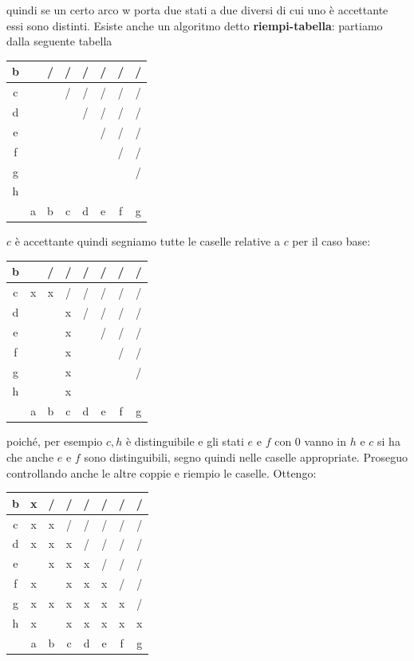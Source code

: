 quindi se un certo arco w porta due stati a due diversi di cui uno è accettante essi sono distinti.
Esiste anche un algoritmo detto \textbf{riempi-tabella}:
partiamo dalla seguente tabella
\begin{center}
	\begin{tabular}{c|c|c|c|c|c|c|c|}
		\hline
		b &   & / & / & / & / & / & / \\
		\hline
		c &   &   & / & / & / & / & / \\
		\hline
		d &   &   &   & / & / & / & / \\
		\hline
		e &   &   &   &   & / & / & / \\
		\hline
		f &   &   &   &   &   & / & / \\
		\hline
		g &   &   &   &   &   &   & / \\
		\hline
		h &   &   &   &   &   &   &   \\
		\hline
		  & a & b & c & d & e & f & g \\
		\hline
	\end{tabular}
\end{center}
$c$ è accettante quindi segniamo tutte le caselle relative a $c$ per il caso base:
\begin{center}
	\begin{tabular}{c|c|c|c|c|c|c|c|}
		\hline
		b &   & / & / & / & / & / & / \\
		\hline
		c & x & x & / & / & / & / & / \\
		\hline
		d &   &   & x & / & / & / & / \\
		\hline
		e &   &   & x &   & / & / & / \\
		\hline
		f &   &   & x &   &   & / & / \\
		\hline
		g &   &   & x &   &   &   & / \\
		\hline
		h &   &   & x &   &   &   &   \\
		\hline
		  & a & b & c & d & e & f & g \\
		\hline
	\end{tabular}
\end{center}
poiché, per esempio $c,h$ è distinguibile e gli stati $e$ e $f$ con 0 vanno in $h$ e $c$ si ha che anche $e$ e $f$ sono distinguibili, segno quindi nelle caselle appropriate. Proseguo controllando anche le altre coppie e riempio le caselle. Ottengo:
\begin{center}
	\begin{tabular}{c|c|c|c|c|c|c|c|}
		\hline
		b & x & / & / & / & / & / & / \\
		\hline
		c & x & x & / & / & / & / & / \\
		\hline
		d & x & x & x & / & / & / & / \\
		\hline
		e &   & x & x & x & / & / & / \\
		\hline
		f & x &   & x & x & x & / & / \\
		\hline
		g & x & x & x & x & x & x & / \\
		\hline
		h & x &   & x & x & x & x & x \\
		\hline
		  & a & b & c & d & e & f & g \\
		\hline
	\end{tabular}
\end{center}

